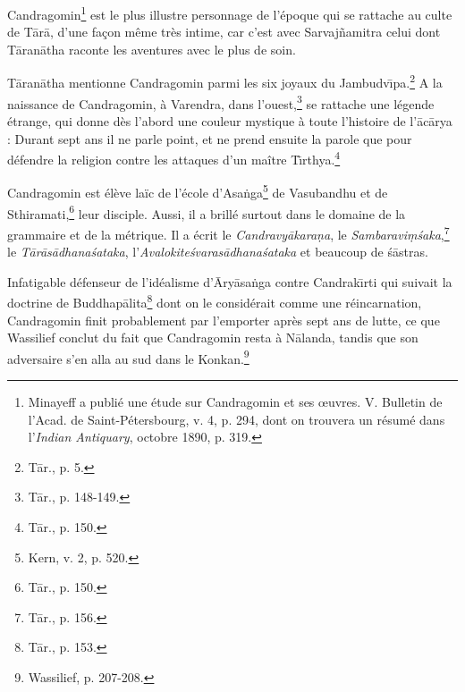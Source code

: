 \documentclass[a4paper, 11pt, oneside, french, landscape, twocolumn]{article}
\begin{document}
Candragomin\footnote{Minayeff a publié une étude sur Candragomin et ses œuvres. V. Bulletin de l'Acad. de Saint-Pétersbourg, v. 4, p. 294, dont on trouvera un résumé dans l'\emph{Indian Antiquary}, octobre 1890, p. 319.} est le plus illustre personnage de l'époque qui se rattache au culte de T\={a}r\={a}, d'une façon même très intime, car c'est avec Sarvaj\~{n}amitra celui dont T\={a}ran\={a}tha raconte les aventures avec le plus de soin.

T\={a}ran\={a}tha mentionne Candragomin parmi les six joyaux du Jambudv\={\i}pa.\footnote{T\={a}r., p. 5.} A la naissance de Candragomin, à Varendra, dans l'ouest,\footnote{T\={a}r., p. 148-149.} se rattache une légende étrange, qui donne dès l'abord une couleur mystique à toute l'histoire de l'\={a}c\={a}rya : Durant sept ans il ne parle point, et ne prend ensuite la parole que pour défendre la religion contre les attaques d'un maître T\={\i}rthya.\footnote{T\={a}r., p. 150.}

Candragomin est élève laïc de l'école d'Asa\.{n}ga\footnote{Kern, v. 2, p. 520.} de Vasubandhu et de Sthiramati,\footnote{T\={a}r., p. 150.} leur disciple. Aussi, il a brillé surtout dans le domaine de la grammaire et de la métrique. Il a écrit le \emph{Candravy\={a}kara\d{n}a}, le \emph{Sambaravi\d{m}\'{s}aka},\footnote{T\={a}r., p. 156.} le \emph{T\={a}r\={a}s\={a}dhana\'{s}ataka}, l'\emph{Avalokite\'{s}varas\={a}dhana\'{s}ataka} et beaucoup de \'{s}\={a}stras.

Infatigable défenseur de l'idéalisme d'\={A}ry\={a}sa\.{n}ga contre Candrak\={\i}rti qui suivait la doctrine de Buddhap\={a}lita\footnote{T\={a}r., p. 153.} dont on le considérait comme une réincarnation, Candragomin finit probablement par l'emporter après sept ans de lutte, ce que Wassilief conclut du fait que Candragomin resta à N\={a}landa, tandis que son adversaire s'en alla au sud dans le Konkan.\footnote{Wassilief, p. 207-208.}
\end{document}

